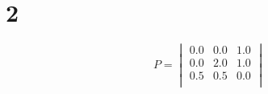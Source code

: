\documentclass[12pt,english]{article}
\begin{document}
\section*{2}
\begin{equation*}
P =
\begin{vmatrix}
0.0 & 0.0 & 1.0\\
0.0 & 2.0 & 1.0\\
0.5 & 0.5 & 0.0\\
\end{vmatrix}
\end{equation*}
\end{document}
